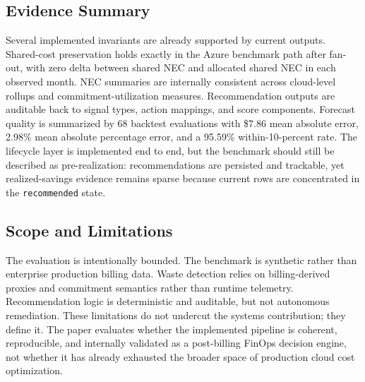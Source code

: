 \subsection{Evidence Summary}
Several implemented invariants are already supported by current outputs. Shared-cost preservation holds exactly in the Azure benchmark path after fan-out, with zero delta between shared NEC and allocated shared NEC in each observed month. NEC summaries are internally consistent across cloud-level rollups and commitment-utilization measures. Recommendation outputs are auditable back to signal types, action mappings, and score components. Forecast quality is summarized by 68 backtest evaluations with \$7.86 mean absolute error, 2.98\% mean absolute percentage error, and a 95.59\% within-10-percent rate. The lifecycle layer is implemented end to end, but the benchmark should still be described as pre-realization: recommendations are persisted and trackable, yet realized-savings evidence remains sparse because current rows are concentrated in the \texttt{recommended} state.

\subsection{Scope and Limitations}
The evaluation is intentionally bounded. The benchmark is synthetic rather than enterprise production billing data. Waste detection relies on billing-derived proxies and commitment semantics rather than runtime telemetry. Recommendation logic is deterministic and auditable, but not autonomous remediation. These limitations do not undercut the systems contribution; they define it. The paper evaluates whether the implemented pipeline is coherent, reproducible, and internally validated as a post-billing FinOps decision engine, not whether it has already exhausted the broader space of production cloud cost optimization.
